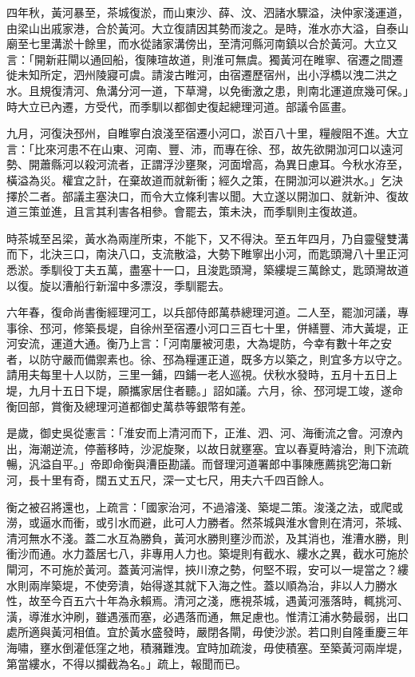 四年秋，黃河暴至，茶城復淤，而山東沙、薛、汶、泗諸水驟溢，決仲家淺運道，由梁山出戚家港，合於黃河。大立復請因其勢而浚之。是時，淮水亦大溢，自泰山廟至七里溝淤十餘里，而水從諸家溝傍出，至清河縣河南鎮以合於黃河。大立又言：「開新莊閘以通回船，復陳瑄故道，則淮可無虞。獨黃河在睢寧、宿遷之間遷徙未知所定，泗州陵寢可虞。請浚古睢河，由宿遷歷宿州，出小浮橋以洩二洪之水。且規復清河、魚溝分河一道，下草灣，以免衝激之患，則南北運道庶幾可保。」時大立已內遷，方受代，而季馴以都御史復起總理河道。部議令區畫。

九月，河復決邳州，自睢寧白浪淺至宿遷小河口，淤百八十里，糧艘阻不進。大立言：「比來河患不在山東、河南、豐、沛，而專在徐、邳，故先欲開泇河口以遠河勢、開蕭縣河以殺河流者，正謂浮沙壅聚，河面增高，為異日慮耳。今秋水洊至，橫溢為災。權宜之計，在棄故道而就新衝；經久之策，在開泇河以避洪水。」乞決擇於二者。部議主塞決口，而令大立條利害以聞。大立遂以開泇口、就新沖、復故道三策並進，且言其利害各相參。會罷去，策未決，而季馴則主復故道。

時茶城至呂梁，黃水為兩崖所束，不能下，又不得決。至五年四月，乃自靈璧雙溝而下，北決三口，南決八口，支流散溢，大勢下睢寧出小河，而匙頭灣八十里正河悉淤。季馴役丁夫五萬，盡塞十一口，且浚匙頭灣，築縷堤三萬餘丈，匙頭灣故道以復。旋以漕船行新溜中多漂沒，季馴罷去。

六年春，復命尚書衡經理河工，以兵部侍郎萬恭總理河道。二人至，罷泇河議，專事徐、邳河，修築長堤，自徐州至宿遷小河口三百七十里，併繕豐、沛大黃堤，正河安流，運道大通。衡乃上言：「河南屢被河患，大為堤防，今幸有數十年之安者，以防守嚴而備禦素也。徐、邳為糧運正道，既多方以築之，則宜多方以守之。請用夫每里十人以防，三里一鋪，四鋪一老人巡視。伏秋水發時，五月十五日上堤，九月十五日下堤，願攜家居住者聽。」詔如議。六月，徐、邳河堤工竣，遂命衡回部，賞衡及總理河道都御史萬恭等銀幣有差。

是歲，御史吳從憲言：「淮安而上清河而下，正淮、泗、河、海衝流之會。河潦內出，海潮逆流，停蓄移時，沙泥旋聚，以故日就壅塞。宜以春夏時濬治，則下流疏暢，汎溢自平。」帝即命衡與漕臣勘議。而督理河道署郎中事陳應薦挑穵海口新河，長十里有奇，闊五丈五尺，深一丈七尺，用夫六千四百餘人。

衡之被召將還也，上疏言：「國家治河，不過濬淺、築堤二策。浚淺之法，或爬或澇，或逼水而衝，或引水而避，此可人力勝者。然茶城與淮水會則在清河，茶城、清河無水不淺。蓋二水互為勝負，黃河水勝則壅沙而淤，及其消也，淮漕水勝，則衝沙而通。水力蓋居七八，非專用人力也。築堤則有截水、縷水之異，截水可施於閘河，不可施於黃河。蓋黃河湍悍，挾川潦之勢，何堅不瑕，安可以一堤當之？縷水則兩岸築堤，不使旁潰，始得遂其就下入海之性。蓋以順為治，非以人力勝水性，故至今百五六十年為永賴焉。清河之淺，應視茶城，遇黃河漲落時，輒挑河、潢，導淮水沖刷，雖遇漲而塞，必遇落而通，無足慮也。惟清江浦水勢最弱，出口處所適與黃河相值。宜於黃水盛發時，嚴閉各閘，毋使沙淤。若口則自隆重慶三年海嘯，壅水倒灌低窪之地，積瀦難洩。宜時加疏浚，毋使積塞。至築黃河兩岸堤，第當縷水，不得以攔截為名。」疏上，報聞而已。


